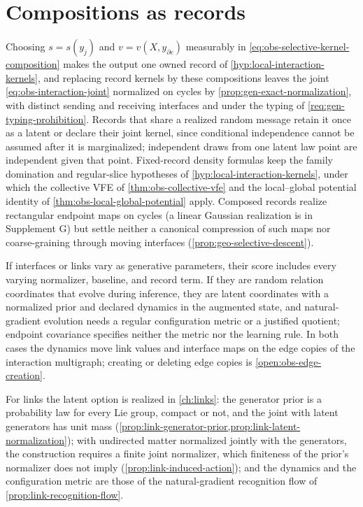 \section{Compositions as records}
\label{sec:selective-records}

Choosing \(s=s(y_j)\) and \(v=v(X,y_{\partial e})\) measurably in
\eqref{eq:obs-selective-kernel-composition} makes the output one owned record
of \cref{hyp:local-interaction-kernels}, and replacing record kernels by these
compositions leaves the joint \eqref{eq:obs-interaction-joint} normalized on
cycles by \cref{prop:gen-exact-normalization}, with distinct sending and
receiving interfaces and under the typing of \cref{req:gen-typing-prohibition}.
Records that share a realized random message retain it once as a latent or
declare their joint kernel, since conditional independence cannot be assumed
after it is marginalized; independent draws from one latent law point are
independent given that point. Fixed-record density formulas keep the family
domination and regular-slice hypotheses of \cref{hyp:local-interaction-kernels},
under which the collective VFE of \cref{thm:obs-collective-vfe} and the
local--global potential identity of \cref{thm:obs-local-global-potential}
apply. Composed records realize rectangular endpoint maps on cycles (a linear
Gaussian realization is in Supplement G) but settle neither a canonical
compression of such maps nor coarse-graining through moving interfaces
(\cref{prop:geo-selective-descent}).

If interfaces or links vary as generative parameters, their score includes
every varying normalizer, baseline, and record term. If they are random
relation coordinates that evolve during inference, they are latent coordinates
with a normalized prior and declared dynamics in the augmented state, and
natural-gradient evolution needs a regular configuration metric or a justified
quotient; endpoint covariance specifies neither the metric nor the learning
rule. In both cases the dynamics move link values and interface maps on the
edge copies of the interaction multigraph; creating or deleting edge
copies is \cref{open:obs-edge-creation}.

For links the latent option is realized in \cref{ch:links}: the generator prior is a probability law for
every Lie group, compact or not, and the joint with latent generators has unit mass
(\cref{prop:link-generator-prior,prop:link-latent-normalization}); with undirected matter normalized
jointly with the generators, the construction requires a finite joint normalizer, which finiteness of the
prior's normalizer does not imply (\cref{prop:link-induced-action}); and the dynamics and the
configuration metric are those of the natural-gradient recognition flow of
\cref{prop:link-recognition-flow}.


